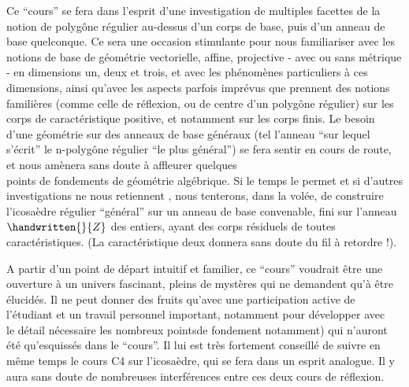 {\reversemarginpar\margin{\handwritten{!}}\normalmarginpar}%
Ce ``cours'' se fera dans l'esprit d'une investigation  de multiples facettes de la notion de polygône régulier au-dessus d'un corps de base, puis d'un anneau de base quelconque. Ce sera une occasion stimulante pour nous familiariser avec les notions de base de géométrie vectorielle, affine, projective - avec ou sans métrique - en dimensions un, deux et trois, et avec les phénomènes particuliers à ces dimensions, ainsi qu'avec les aspects parfois imprévus que prennent des notions familières (comme celle de réflexion, ou de centre d'un polygône régulier) sur les corps de caractéristique positive, et notamment sur les corps finis. Le besoin d'une géométrie sur des anneaux de base généraux (tel l'anneau ``sur lequel s'écrit'' le $\mathrm{n}$-polygône régulier ``le plus général'') se fera sentir en cours de route, et nous amènera sans doute à affleurer quelques\\
points de fondements de géométrie algébrique. Si le temps le permet et si d'autres investigations ne nous retiennent , nous tenterons, dans la volée, de construire l'icosaèdre régulier ``général'' sur un anneau de base convenable, fini sur l'anneau \hspace{.5em}${\handwritten{\mathbb}{Z}}$\hspace{.5em} des entiers, ayant des corps résiduels de toutes caractéristiques. (La caractéristique deux \hspace{.5em}donnera sans doute du fil à retordre !).

A partir d'un point de départ intuitif et familier, ce ``cours'' voudrait être une ouverture à un univers fascinant, pleins de mystères qui ne demandent qu'à être élucidés. Il ne peut donner des fruits qu'avec une participation active de l'étudiant et un travail personnel important, notamment pour développer avec\\
le détail nécessaire les nombreux points\handwritten{(}de fondement notamment) qui n'auront été qu'esquissés dans le ``cours''. Il lui est très fortement conseillé de suivre en même temps le cours \hspace{.5em}C4\hspace{.5em} sur l'icosaèdre, qui se fera dans un esprit analogue. Il y aura sans doute de nombreuses interférences entre ces deux cours de réflexion.

